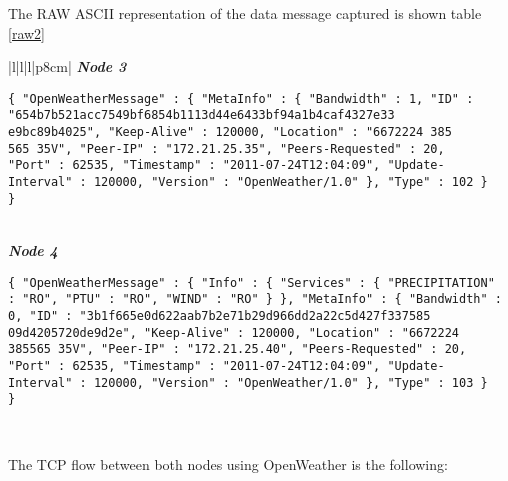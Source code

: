 The RAW \gls{ASCII} representation of the data message captured is shown table \ref{raw2}

\begin{table}[H]
\centering
\begin{tabular}{|l|l|l|p{8cm}|}
\hline    
\textbf{\emph{Node 3}}\\
\hline
\begin{minipage}[t]{\linewidth}
\begin{verbatim}
{ "OpenWeatherMessage" : { "MetaInfo" : { "Bandwidth" : 1, "ID" :
"654b7b521acc7549bf6854b1113d44e6433bf94a1b4caf4327e33
e9bc89b4025", "Keep-Alive" : 120000, "Location" : "6672224 385
565 35V", "Peer-IP" : "172.21.25.35", "Peers-Requested" : 20, 
"Port" : 62535, "Timestamp" : "2011-07-24T12:04:09", "Update-
Interval" : 120000, "Version" : "OpenWeather/1.0" }, "Type" : 102 }
}

\end{verbatim}
\end{minipage} \\
\hline    
\textbf{\emph{Node 4}}\\
\hline
\begin{minipage}[t]{\linewidth}
\begin{verbatim}
{ "OpenWeatherMessage" : { "Info" : { "Services" : { "PRECIPITATION"
: "RO", "PTU" : "RO", "WIND" : "RO" } }, "MetaInfo" : { "Bandwidth" : 
0, "ID" : "3b1f665e0d622aab7b2e71b29d966dd2a22c5d427f337585
09d4205720de9d2e", "Keep-Alive" : 120000, "Location" : "6672224 
385565 35V", "Peer-IP" : "172.21.25.40", "Peers-Requested" : 20, 
"Port" : 62535, "Timestamp" : "2011-07-24T12:04:09", "Update-
Interval" : 120000, "Version" : "OpenWeather/1.0" }, "Type" : 103 } 
}
\end{verbatim}
\end{minipage} \\
\hline
\end{tabular}
\caption{Data messages transmitted between \emph{Node 3} and \emph{Node 4}.}
\label{raw2}
\end{table}

The \gls{TCP} flow between both nodes using OpenWeather is the following:

